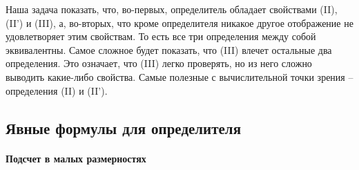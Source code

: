 Наша задача показать, что, во-первых, определитель обладает свойствами  (II), (II') и (III), а, во-вторых, что кроме определителя никакое другое отображение не удовлетворяет этим свойствам.
То есть все три определения между собой эквивалентны.
Самое сложное будет показать, что (III) влечет остальные два определения.
Это означает, что (III) легко проверять, но из него сложно выводить какие-либо свойства.
Самые полезные с вычислительной точки зрения -- определения (II) и (II').

\subsection{Явные формулы для определителя}
\label{section::DetSimpleCases}

\paragraph{Подсчет в малых размерностях}

